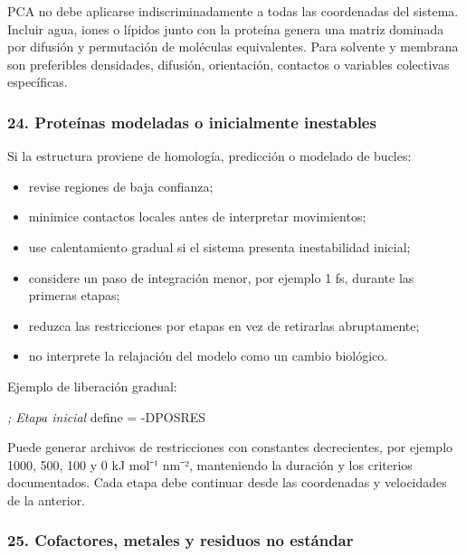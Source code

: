 \documentclass[
  spanish,
  11pt,
  a4paper]{article}
\newenvironment{Shaded}{\begin{snugshade}}{\end{snugshade}}
\newcommand{\CommentTok}[1]{\textcolor[rgb]{0.56,0.35,0.01}{\textit{#1}}}
\newcommand{\DataTypeTok}[1]{\textcolor[rgb]{0.13,0.29,0.53}{#1}}
\newcommand{\OtherTok}[1]{\textcolor[rgb]{0.56,0.35,0.01}{#1}}
\newcommand{\StringTok}[1]{\textcolor[rgb]{0.31,0.60,0.02}{#1}}
\providecommand{\tightlist}{%
  \setlength{\itemsep}{0pt}\setlength{\parskip}{0pt}}
\begin{document}
PCA no debe aplicarse indiscriminadamente a todas las coordenadas del
sistema. Incluir agua, iones o lípidos junto con la proteína genera una
matriz dominada por difusión y permutación de moléculas equivalentes.
Para solvente y membrana son preferibles densidades, difusión,
orientación, contactos o variables colectivas específicas.

\subsubsection{24. Proteínas modeladas o inicialmente
inestables}\label{proteuxednas-modeladas-o-inicialmente-inestables}

Si la estructura proviene de homología, predicción o modelado de bucles:

\begin{itemize}
\tightlist
\item
  revise regiones de baja confianza;
\item
  minimice contactos locales antes de interpretar movimientos;
\item
  use calentamiento gradual si el sistema presenta inestabilidad
  inicial;
\item
  considere un paso de integración menor, por ejemplo 1 fs, durante las
  primeras etapas;
\item
  reduzca las restricciones por etapas en vez de retirarlas
  abruptamente;
\item
  no interprete la relajación del modelo como un cambio biológico.
\end{itemize}

Ejemplo de liberación gradual:

\begin{Shaded}
\begin{Highlighting}[]
\CommentTok{; Etapa inicial}
\DataTypeTok{define }\OtherTok{=}\StringTok{ {-}DPOSRES}
\end{Highlighting}
\end{Shaded}

Puede generar archivos de restricciones con constantes decrecientes, por
ejemplo 1000, 500, 100 y 0 kJ mol⁻¹ nm⁻², manteniendo la duración y los
criterios documentados. Cada etapa debe continuar desde las coordenadas
y velocidades de la anterior.

\subsubsection{25. Cofactores, metales y residuos no
estándar}\label{cofactores-metales-y-residuos-no-estuxe1ndar}
\end{document}
